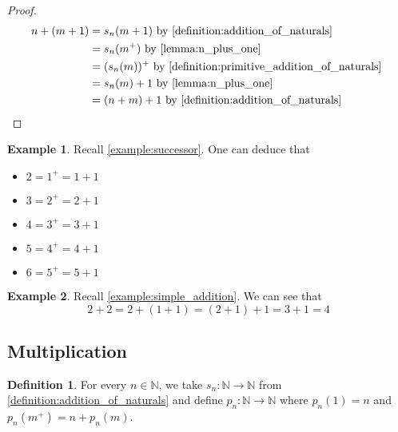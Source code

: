 \documentclass{article}
\theoremstyle{definition}
\newtheorem{definition}{Definition}[section]
\theoremstyle{definition}
\newtheorem{example}{Example}[section]
\theoremstyle{plain}
\theoremstyle{remark}
\theoremstyle{plain}
\theoremstyle{remark}
\theoremstyle{plain}
\theoremstyle{plain}
\theoremstyle{plain}
\theoremstyle{plain}
\begin{document}
\begin{proof}
  \begin{align*}
    n + (m+1) &= s_n(m+1)  
                 \text{
                   by \autoref{definition:addition_of_naturals}
                 } \\
              &= s_n(m^{+})  
                 \text{
                   by \autoref{lemma:n_plus_one}
                 } \\
              &= (s_n(m))^{+} 
                 \text{
                   by \autoref{definition:primitive_addition_of_naturals}
                 } \\
              &= s_n(m) + 1
                  \text{
                   by \autoref{lemma:n_plus_one}
                 } \\
              &= (n + m) + 1
                   \text{
                   by \autoref{definition:addition_of_naturals}
                 } \\
  \end{align*}
\end{proof}

\begin{example}
  Recall \autoref{example:successor}. 
  One can deduce that 
  \begin{itemize}
    \item \(2 = 1^{+} = 1 + 1 \)
    \item \(3 = 2^{+} = 2 + 1 \)
    \item \(4 = 3^{+} = 3 + 1\)
    \item \(5 = 4^{+} = 4 + 1\)
    \item \(6 = 5^{+} = 5 + 1 \)
  \end{itemize}
  \label{example:simple_addition}
\end{example}

\begin{example}
  Recall \autoref{example:simple_addition}. We can see that 
  \[ 2 + 2 = 2 + (1 + 1) = (2 + 1) + 1 = 3 + 1 = 4 \]
  \label{example:two_plus_two}
\end{example}

\subsection{Multiplication}

\begin{definition}
  For every \( n \in \mathbb{N} \), we take 
  \(s_n: \mathbb{N} \rightarrow \mathbb{N} \) from 
  \autoref{definition:addition_of_naturals} and define 
  \( p_n: \mathbb{N} \rightarrow \mathbb{N} \) where 
  \( p_n(1) = n \) and \( p_n(m^{+}) = n + p_n(m) \). 
  \label{definition:primitive_multiplication_of_naturals}
\end{definition}
\end{document}

